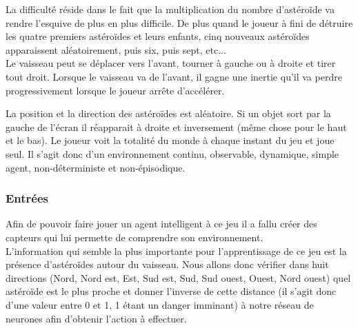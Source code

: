 \documentclass{article}
\begin{document}
La difficulté réside dans le fait que la multiplication du nombre d'astéroïde va rendre l'esquive de plus en plus difficile. De plus quand le joueur à fini de détruire les quatre premiers astéroïdes et leurs enfants, cinq nouveaux astéroïdes apparaissent aléatoirement, puis six, puis sept, etc...\\

Le vaisseau peut se déplacer vers l'avant, tourner à gauche ou à droite et tirer tout droit. Lorsque le vaisseau va de l'avant, il gagne une inertie qu'il va perdre progressivement lorsque le joueur arrête d'accélérer.

La position et la direction des astéroïdes est aléatoire. Si un objet sort par la gauche de l'écran il réapparait à droite et inversement (même chose pour le haut et le bas). Le joueur voit la totalité du monde à chaque instant du jeu et joue seul. Il s'agit donc d'un environnement continu, observable, dynamique, simple agent, non-déterministe et non-épisodique.\\

\subsubsection{Entrées}

Afin de pouvoir faire jouer un agent intelligent à ce jeu il a fallu créer des capteurs qui lui permette de comprendre son environnement.\\

L'information qui semble la plus importante pour l'apprentissage de ce jeu est la présence d'astéroïdes autour du vaisseau. Nous allons donc vérifier dans huit directions (Nord, Nord est, Est, Sud est, Sud, Sud ouest, Ouest, Nord ouest) quel astéroïde est le plus proche et donner l'inverse de cette distance (il s'agit donc d'une valeur entre 0 et 1, 1 étant un danger imminant) à notre réseau de neurones afin d'obtenir l'action à effectuer.\\
\end{document}
